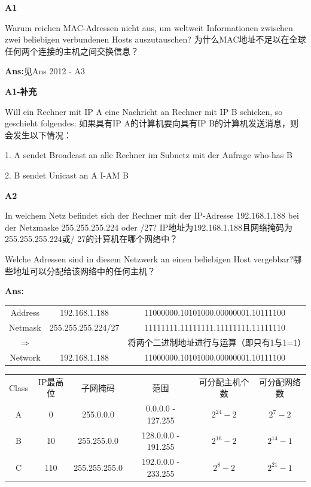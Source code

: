 \documentclass[fleqn]{article}
\begin{document}
\noindent\textbf{A1}

Warum reichen MAC-Adressen nicht aus, um weltweit Informationen zwischen zwei beliebigen verbundenen Hosts auszutauschen?
为什么MAC地址不足以在全球任何两个连接的主机之间交换信息？

\textbf{Ans:}见Ans 2012 - A3

\noindent\textbf{A1-补充}

Will ein Rechner mit IP A eine Nachricht an Rechner mit IP B schicken, so geschieht folgendes:
如果具有IP A的计算机要向具有IP B的计算机发送消息，则会发生以下情况：

1. A sendet Broadcast an alle Rechner im Subnetz mit der Anfrage who-has B

2. B sendet Unicast an A I-AM B

\noindent\textbf{A2}

In welchem Netz befindet sich der Rechner mit der IP-Adresse 192.168.1.188 bei der Netzmaske 255.255.255.224 oder /27? 
IP地址为192.168.1.188且网络掩码为255.255.255.224或/ 27的计算机在哪个网络中？

Welche Adressen sind in diesem Netzwerk an einen beliebigen Host vergebbar?哪些地址可以分配给该网络中的任何主机？

\textbf{Ans:}

\begin{center}
    \begin{tabular}{c|c|c}
        Address&192.168.1.188&11000000.10101000.00000001.10111100\\
        Netmask&255.255.255.224/27&11111111.11111111.11111111.11111110\\
        $\Rightarrow$&&将两个二进制地址进行与运算（即只有1与1=1）\\
        Network&192.168.1.188&11000000.10101000.00000001.10111100
    \end{tabular}
\end{center}

\begin{center}
    \begin{tabular}{c|c|c|c|c|c}
        Class&IP最高位&子网掩码&范围&可分配主机个数&可分配网络数\\
        A&0&255.0.0.0&0.0.0.0 - 127.255&$2^{24}-2$&$2^7-2$\\
        B&10&255.255.0.0&128.0.0.0 - 191.255&$2^{16}-2$&$2^{14}-1$\\
        C&110&255.255.255.0&192.0.0.0 - 233.255&$2^{8}-2$&$2^{21}-1$
    \end{tabular}
\end{center}
\end{document}
